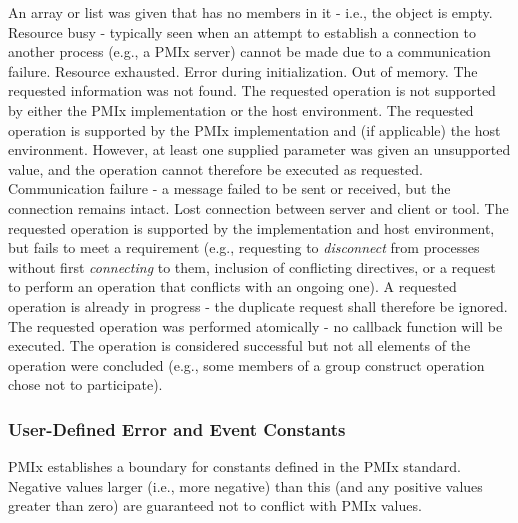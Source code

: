 \begin{constantdesc}
%
An array or list was given that has no members in it - i.e., the object is empty.
%
Resource busy - typically seen when an attempt to establish a connection
to another process (e.g., a \ac{PMIx} server) cannot be made due to a
communication failure.
%
Resource exhausted.
%
Error during initialization.
%
Out of memory.
%
The requested information was not found.
%
The requested operation is not supported by either the \ac{PMIx} implementation
or the host environment.
%
The requested operation is supported by the \ac{PMIx} implementation and (if applicable) the host environment. However, at least one supplied parameter was given an unsupported value, and the operation cannot therefore be executed as requested.
%
Communication failure - a message failed to be sent or received, but the
connection remains intact.
%
Lost connection between server and client or tool.
%
The requested operation is supported by the implementation and host environment, but fails to meet a requirement (e.g., requesting to \textit{disconnect} from processes without first \textit{connecting} to them, inclusion of conflicting directives, or a request to perform an operation that conflicts with an ongoing one).
%
A requested operation is already in progress - the duplicate request
shall therefore be ignored.
%
The requested operation was performed atomically - no callback function will be executed.
%
The operation is considered successful but not all elements of the operation were concluded (e.g., some members of a group construct operation chose not to participate).
%
\end{constantdesc}


\subsubsection{User-Defined Error and Event Constants}
\label{api:struct:usererrors}

\ac{PMIx} establishes a boundary for constants defined in the \ac{PMIx} standard. Negative values larger (i.e., more negative) than this (and any positive values greater than zero) are guaranteed not to conflict with \ac{PMIx} values.

